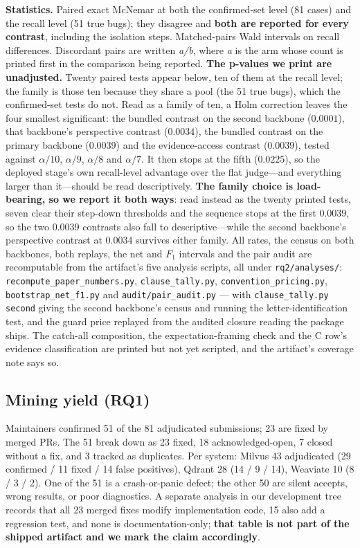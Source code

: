 \documentclass[acmsmall,screen,review,anonymous]{acmart}
\begin{document}
\textbf{Statistics.} Paired exact McNemar at both the confirmed-set level (81 cases) and the recall
level (51 true bugs); they disagree and \textbf{both are reported for every contrast}, including the
isolation steps. Matched-pairs Wald intervals on recall differences. Discordant pairs are written
\emph{a/b}, where \emph{a} is the arm whose count is printed first in the comparison being reported.
\textbf{The p-values we print are unadjusted.} Twenty paired tests appear below, ten of them at the
recall level; the family is those ten because they share a pool (the 51 true bugs), which the confirmed-set tests
do not. Read as a family of ten, a Holm correction leaves the four smallest significant: the
bundled contrast on the second backbone ($0.0001$), that backbone's perspective contrast
($0.0034$), the bundled contrast on the primary backbone ($0.0039$) and the evidence-access contrast
($0.0039$), tested against $\alpha/10$, $\alpha/9$, $\alpha/8$ and $\alpha/7$. It then stops at the
fifth ($0.0225$), so the deployed stage's own recall-level advantage over the flat judge---and
everything larger than it---should be read descriptively. \textbf{The family choice is load-bearing,
so we report it both ways}: read instead as the twenty printed tests, seven clear their step-down
thresholds and the sequence stops at the first $0.0039$, so the two $0.0039$ contrasts also fall to
descriptive---while the second backbone's perspective contrast at $0.0034$ survives either family. All rates, the census on both backbones,
both replays, the net and $F_1$ intervals and the pair audit are recomputable from the artifact's
five analysis scripts, all under \texttt{rq2/analyses/}: \texttt{recompute\_paper\_numbers.py},
\texttt{clause\_tally.py}, \texttt{convention\_pricing.py}, \texttt{bootstrap\_net\_f1.py} and
\texttt{audit/pair\_audit.py} --- with \texttt{clause\_tally.py second} giving the second backbone's
census and running the letter-identification test, and the guard price replayed from the audited
closure reading the package ships. The catch-all composition, the expectation-framing check and the
C row's evidence classification are printed but not yet scripted, and the artifact's coverage note
says so.

\subsection{Mining yield (RQ1)}
\label{sec:yield}

Maintainers confirmed 51 of the 81 adjudicated submissions; 23 are fixed by merged PRs. The 51 break
down as 23 fixed, 18 acknowledged-open, 7 closed without a fix, and 3 tracked as duplicates. Per
system: Milvus 43 adjudicated (29 confirmed / 11 fixed / 14 false positives), Qdrant 28 (14 / 9 /
14), Weaviate 10 (8 / 3 / 2). One of the 51 is a crash-or-panic defect; the other 50 are silent
accepts, wrong results, or poor diagnostics. A separate analysis in our development tree records
that all 23 merged fixes modify implementation code, 15 also add a regression test, and none is
documentation-only; \textbf{that table is not part of the shipped artifact and we mark the claim
accordingly}.
\end{document}
